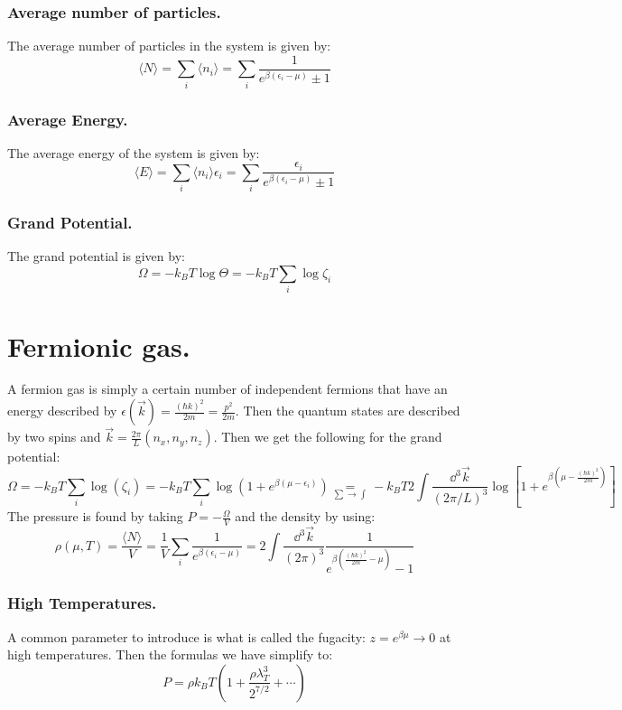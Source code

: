 \documentclass[10pt,a4paper]{book}
\begin{document}
\subsubsection{Average number of particles.}
The average number of particles in the system is given by:
\[
\langle N \rangle = \sum_i \langle n_i \rangle = \sum_i \frac{1}{e^{\beta(\epsilon_i - \mu)} \pm 1}
\]

\subsubsection{Average Energy.}
The average energy of the system is given by:
\[
\langle E \rangle = \sum_i \langle n_i \rangle \epsilon_i = \sum_i \frac{\epsilon_i}{e^{\beta(\epsilon_i - \mu)} \pm 1}
\]

\subsubsection{Grand Potential.}
The grand potential is given by:
\[
\Omega = - k_B T \log \Theta = -k_B T \sum_i \log \zeta_i
\]

\section{Fermionic gas.}
A fermion gas is simply a certain number of independent fermions that have an energy described by $\epsilon(\vec{k}) = \frac{(\hbar k)^2}{2m} = \frac{p^2}{2m}$. Then the quantum states are described by two spins and $\vec{k} = \frac{2\pi}{L}(n_x, n_y, n_z)$. Then we get the following for the grand potential:
\[
\Omega = -k_BT\sum_i\log(\zeta_i)=-k_BT\sum_i\log(1+e^{\beta(\mu-\epsilon_i)})\underset{\sum\to\int}{=} -k_B T 2 \int \frac{\dd^3 \vec{k}}{(2 \pi/L)^3} \log[1 + e^{\beta(\mu - \frac{(\hbar k)^2}{2m})}]
\]
The pressure is found by taking $P = -\frac{\Omega}{V}$ and the density by using:
\[
\rho(\mu, T) = \frac{\langle N \rangle}{V} = \frac{1}{V}\sum_i \frac{1}{e^{\beta(\epsilon_i-\mu)}}=
2 \int \frac{\dd^3 \vec{k}}{(2\pi)^3} \frac{1}{e^{\beta(\frac{(\hbar k)^2}{2m} - \mu)} - 1}
\]

\subsubsection{High Temperatures.}
A common parameter to introduce is what is called the fugacity: $z = e^{\beta \mu} \to 0$ at high temperatures. Then the formulas we have simplify to:
\[
P = \rho k_B T\left(1 + \frac{\rho \lambda_T^3}{2^{7/2}}  + \cdots \right)
\]
\end{document}
